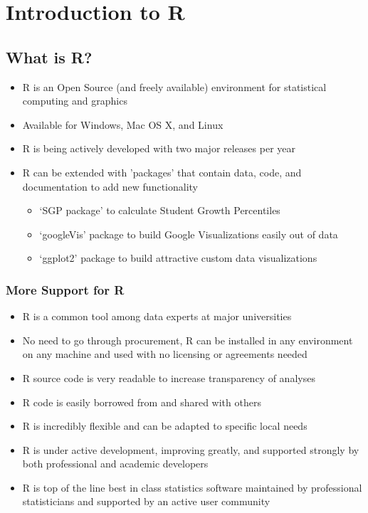 \documentclass{beamer}
\begin{document}
\section{Introduction to R}
\label{sec:intro-r}

\subsection{What is R?}
\label{sec:what-r}


\begin{frame}
  \begin{itemize}
  \item R is an Open Source (and freely available) environment for statistical computing and graphics
  \item Available for Windows, Mac OS X, and Linux
  \item R is being actively developed with two major releases per year
  \item R can be extended with 'packages' that contain data, code, and documentation to add new functionality
    \begin{itemize}
    \item `SGP package' to calculate Student Growth Percentiles
    \item `googleVis' package to build Google Visualizations easily out of data
    \item `ggplot2' package to build attractive custom data visualizations
    \end{itemize}
  \end{itemize}
\end{frame}

\begin{frame}
\frametitle{More Support for R}
  \begin{itemize}
  \item R is a common tool among data experts at major universities
  \item No need to go through procurement, R can be installed in any environment on any machine and used with no licensing or agreements needed
  \item R source code is very readable to increase transparency of analyses
  \item R code is easily borrowed from and shared with others
  \item R is incredibly flexible and can be adapted to specific local needs
  \item R is under active development, improving greatly, and supported strongly by both professional and academic developers
  \item R is top of the line best in class statistics software maintained by professional statisticians and supported by an active user community
  \end{itemize}
\end{frame}
\end{document}
